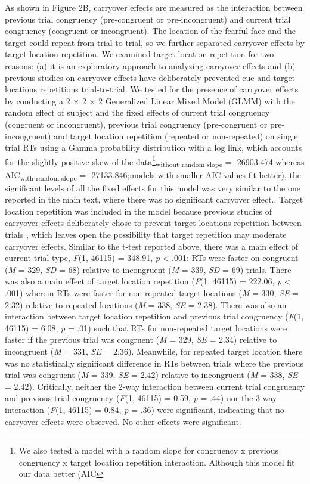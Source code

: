 \documentclass{article}
\begin{document}
	As shown in Figure 2B, carryover effects are measured as the interaction between previous trial congruency (pre-congruent or pre-incongruent) and current trial congruency (congruent or incongruent). The location of the fearful face and the target could repeat from trial to trial, so we further separated carryover effects by target location repetition. We examined target location repetition for two reasons: (a) it is an exploratory approach to analyzing carryover effects and (b) previous studies on carryover effects \autocite{Gladwin2019a} have deliberately prevented cue and target locations repetitions trial-to-trial. We tested for the presence of carryover effects by conducting a 2 × 2 × 2 Generalized Linear Mixed Model (GLMM) with the random effect of subject and the fixed effects of current trial congruency (congruent or incongruent), previous trial congruency (pre-congruent or pre-incongruent) and target location repetition (repeated or non-repeated) on single trial RTs using a Gamma probability distribution with a log link, which accounts for the slightly positive skew of the data\footnote{We also tested a model with a random slope for congruency x previous congruency x target location repetition interaction. Although this model fit our data better (AIC}{\textsubscript{without random slope}}{ = -26903.474 whereas AIC}{\textsubscript{with random slope}}{ = -27133.846;models with smaller AIC values fit better), the significant levels of all the fixed effects for this model was very similar to the one reported in the main text, where there was no significant carryover effect.}. Target location repetition was included in the model because previous studies of carryover effects deliberately chose to prevent target locations repetition between trials \autocite{Gladwin2019a}, which leaves open the possibility that target repetition may moderate carryover effects. Similar to the t-test reported above, there was a main effect of current trial type, \emph{F}(1, 46115) = 348.91, \emph{p }< .001: RTs were faster on congruent (\emph{M }= 329, \emph{SD}\emph{ }= 68) relative to incongruent (\emph{M }= 339, \emph{SD }= 69) trials. There was also a main effect of target location repetition (\emph{F}(1, 46115) = 222.06, \emph{p }< .001) wherein RTs were faster for non-repeated target locations (\emph{M }= 330, \emph{SE }= 2.32) relative to repeated locations (\emph{M }= 338, \emph{SE }= 2.38). There was also an interaction between target location repetition and previous trial congruency (\emph{F}(1, 46115) = 6.08, \emph{p }= .01) such that RTs for non-repeated target locations were faster if the previous trial was congruent (\emph{M }= 329, \emph{SE }= 2.34) relative to incongruent (\emph{M }= 331, \emph{SE }= 2.36). Meanwhile, for repeated target location there was no statistically significant difference in RTs between trials where the previous trial was congruent (\emph{M }= 339, \emph{SE }= 2.42) relative to incongruent (\emph{M }= 338, \emph{SE }= 2.42). Critically, neither the 2-way interaction between current trial congruency and previous trial congruency (\emph{F}(1, 46115) = 0.59, \emph{p }= .44) nor the 3-way interaction (\emph{F}(1, 46115) = 0.84, \emph{p }= .36) were significant, indicating that no carryover effects were observed. No other effects were significant.
\end{document}

